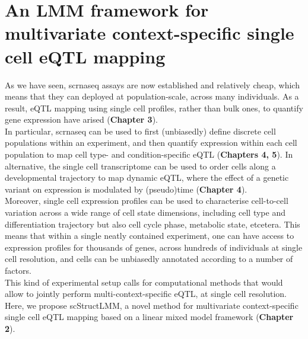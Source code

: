 
\chapter{An LMM framework for multivariate context-specific single cell eQTL mapping}
\label{chapter6}

As we have seen, \gls{scrnaseq} assays are now established and relatively cheap, which means that they can deployed at population-scale, across many individuals. 
As a result, eQTL mapping using single cell profiles, rather than bulk ones, to quantify gene expression have arised (\textbf{Chapter 
3}).\\

In particular, \gls{scrnaseq} can be used to first (unbiasedly) define discrete cell populations within an experiment, and then quantify expression within each cell population to map cell type- and condition-specific eQTL (\textbf{Chapters 
4, 5}).
In alternative, the single cell transcriptome can be used to order cells along a developmental trajectory to map dynamic eQTL, where the effect of a genetic variant on expression is modulated by (pseudo)time (\textbf{Chapter 
4}). \\


Moreover, single cell expression profiles can be used to characterise cell-to-cell variation across a wide range of cell state dimensions,
including cell type and differentiation trajectory but also cell cycle phase, metabolic state, etcetera.
This means that within a single neatly contained experiment, one can have access to expression profiles for thousands of genes, across hundreds of individuals at single cell resolution, and cells can be unbiasedly annotated according to a number of factors. \\

This kind of experimental setup calls for computational methods that would allow to jointly perform multi-context-specific eQTL, at single cell resolution.
Here, we propose scStructLMM, a novel method for multivariate context-specific single cell eQTL mapping based on a linear mixed model framework (\textbf{Chapter 
2}).

